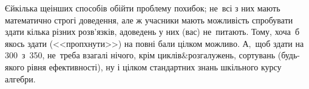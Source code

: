 Є\nolinebreak[3] й\nolinebreak[3] кілька ще\nolinebreak[3] інших способів обійти проблему похибок; не~всі з них мають математично строгі доведення, але ж учасники мають можливість спробувати здати кілька різних розв'язків, а\nolinebreak[3] доведень у них (вас) не~питають. Тому, хоча~б якось здати (<<пропхнути>>) на повні бали цілком можливо. А,~щоб здати на 300~з~350, не~треба взагалі нічого, крім циклів\&розгалужень, сортувань (будь-якого рівня ефективності), ну і цілком стандартних знань шкільного курсу алгебри.


